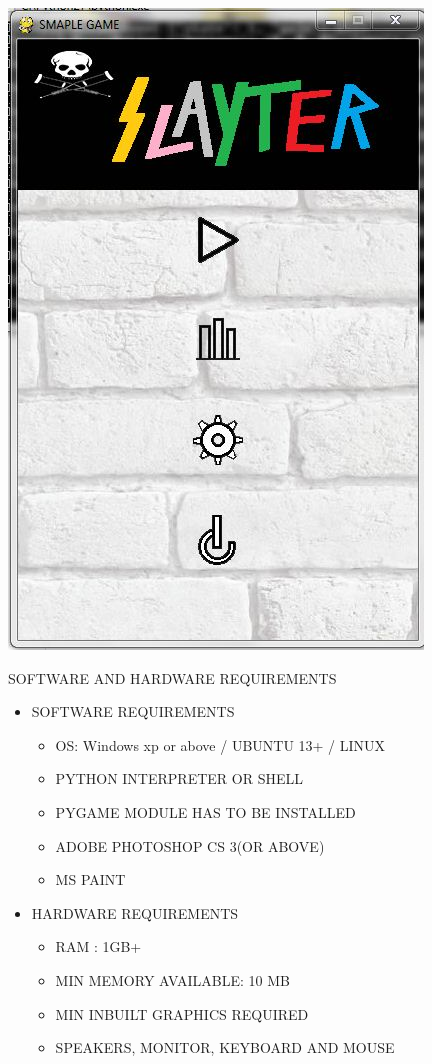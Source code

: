 \documentclass[11pt]{beamer}
\begin{document}
\begin{frame}
\begin{center}
\includegraphics[scale=0.5]{Capture.jpg}
\end{center}
\end{frame}


\begin{frame}{SOFTWARE AND HARDWARE REQUIREMENTS}
\begin{itemize}
\item SOFTWARE REQUIREMENTS
\begin{itemize}
\item OS: Windows xp or above / UBUNTU 13+ / LINUX  
\item PYTHON INTERPRETER OR SHELL
\item PYGAME MODULE HAS TO BE INSTALLED
\item ADOBE PHOTOSHOP CS 3(OR ABOVE)
\item MS PAINT
\end{itemize}
\item HARDWARE REQUIREMENTS
\begin{itemize}
\item RAM : 1GB+
\item MIN MEMORY AVAILABLE: 10 MB
\item MIN INBUILT GRAPHICS REQUIRED
\item SPEAKERS, MONITOR, KEYBOARD AND MOUSE
\end{itemize}
\end{itemize}
\end{frame}
\end{document}
